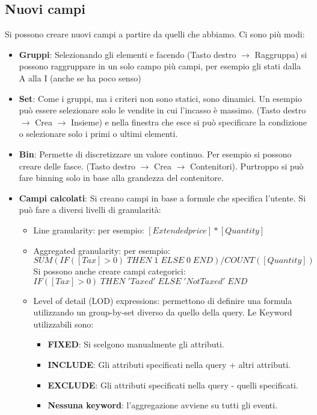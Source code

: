 \subsection{Nuovi campi}
Si possono creare nuovi campi a partire da quelli che abbiamo. Ci sono più modi:
\begin{itemize}
	\item \textbf{Gruppi}: Selezionando gli elementi e facendo (Tasto destro $\xrightarrow{}$ Raggruppa) si possono raggruppare in un solo campo più campi, per esempio gli stati dalla A alla I (anche se ha poco senso)
	\item \textbf{Set}: Come i gruppi, ma i criteri non sono statici, sono dinamici. Un esempio può essere selezionare solo le vendite in cui l'incasso è massimo. (Tasto destro $\xrightarrow{}$ Crea $\xrightarrow{}$ Insieme) e nella finestra che esce si può specificare la condizione o selezionare solo i primi o ultimi elementi.
	\item \textbf{Bin}: Permette di discretizzare un valore continuo. Per esempio si possono creare delle fasce. (Tasto destro $\xrightarrow{}$ Crea $\xrightarrow{}$ Contenitori). Purtroppo si può fare binning solo in base alla grandezza del contenitore.
	\item \textbf{Campi calcolati}: Si creano campi in base a formule che specifica l'utente. Si può fare a diversi livelli di granularità:
	\begin{itemize}
		\item Line granularity: per esempio: $[Extendedprice] * [Quantity]$
		\item Aggregated granularity: per esempio:\newline $SUM(IF([Tax]>0)\;THEN\;1\;ELSE\;0\; END)/COUNT([Quantity])$
		Si possono anche creare campi categorici:\newline
		$IF([Tax]>0)\;THEN\;'Taxed'\;ELSE\;'Not Taxed'\; END$
		\item Level of detail (LOD) expressions: permettono di definire una formula utilizzando un group-by-set diverso da quello della query. Le Keyword utilizzabili sono:
		\begin{itemize}
			\item \textbf{FIXED}: Si scelgono manualmente gli attributi.
			\item \textbf{INCLUDE}: Gli attributi specificati nella query + altri attributi.
			\item \textbf{EXCLUDE}: Gli attributi specificati nella query - quelli specificati.
			\item \textbf{Nessuna keyword}: l'aggregazione avviene su tutti gli eventi.
		\end{itemize}
	\end{itemize}
\end{itemize}
\newpage